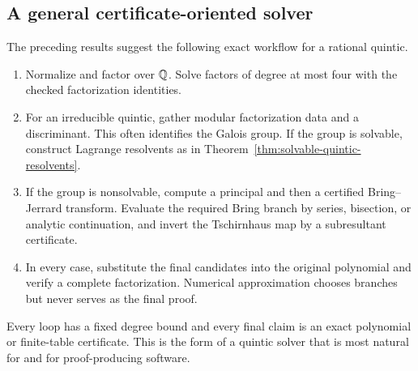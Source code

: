 \subsection{A general certificate-oriented solver}

The preceding results suggest the following exact workflow for a rational
quintic.

\begin{enumerate}
\item Normalize and factor over \(\mathbb Q\).  Solve factors of degree at most four
      with the checked factorization identities.
\item For an irreducible quintic, gather modular factorization data and a
      discriminant.  This often identifies the Galois group.  If the group is
      solvable, construct Lagrange resolvents as in
      Theorem~\ref{thm:solvable-quintic-resolvents}.
\item If the group is nonsolvable, compute a principal and then a certified
      Bring--Jerrard transform.  Evaluate the required Bring branch by series,
      bisection, or analytic continuation, and invert the Tschirnhaus map by a
      subresultant certificate.
\item In every case, substitute the final candidates into the original
      polynomial and verify a complete factorization.  Numerical approximation
      chooses branches but never serves as the final proof.
\end{enumerate}

Every loop has a fixed degree bound and every final claim is an exact polynomial
or finite-table certificate.  This is the form of a quintic solver that is most
natural for \ipra{} and for proof-producing software.
